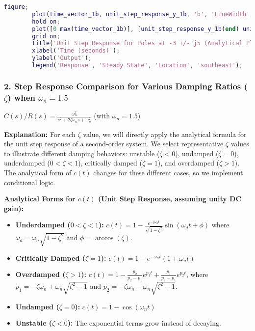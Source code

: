 \documentclass{article}
\begin{document}
\begin{lstlisting}[language=Matlab, caption=MATLAB Code for Problem 1(b) (Using Formulas)]
		figure;
		plot(time_vector_1b, unit_step_response_y_1b, 'b', 'LineWidth', 1.5);
		hold on;
		plot([0 max(time_vector_1b)], [unit_step_response_y_1b(end) unit_step_response_y_1b(end)], 'r--', 'DisplayName', 'Steady State');
		grid on;
		title('Unit Step Response for Poles at -3 +/- j5 (Analytical Plot)');
		xlabel('Time (seconds)');
		ylabel('Output');
		legend('Response', 'Steady State', 'Location', 'southeast');
	\end{lstlisting}
	
	\subsubsection*{2. Step Response Comparison for Various Damping Ratios ($\zeta$) when $\omega_n = 1.5$}
	$C(s)/R(s) = \frac{\omega_n^2}{s^2 + 2\zeta\omega_n s + \omega_n^2}$ (with $\omega_n = 1.5$)
	
	\textbf{Explanation:}
	For each $\zeta$ value, we will directly apply the analytical formula for the unit step response of a second-order system.
	We select representative $\zeta$ values to illustrate different damping behaviors: unstable ($\zeta < 0$), undamped ($\zeta = 0$), underdamped ($0 < \zeta < 1$), critically damped ($\zeta = 1$), and overdamped ($\zeta > 1$). The analytical form of $c(t)$ changes for these different cases, so we implement conditional logic.
	
	\textbf{Analytical Forms for $c(t)$ (Unit Step Response, assuming unity DC gain):}
	\begin{itemize}
		\item \textbf{Underdamped ($0 < \zeta < 1$):}
		$c(t) = 1 - \frac{e^{-\zeta\omega_n t}}{\sqrt{1-\zeta^2}} \sin(\omega_d t + \phi)$ where $\omega_d = \omega_n \sqrt{1-\zeta^2}$ and $\phi = \arccos(\zeta)$.
		
		\item \textbf{Critically Damped ($\zeta = 1$):}
		$c(t) = 1 - e^{-\omega_n t} (1 + \omega_n t)$
		
		\item \textbf{Overdamped ($\zeta > 1$):}
		$c(t) = 1 - \frac{p_2}{p_2-p_1} e^{p_1 t} + \frac{p_1}{p_2-p_1} e^{p_2 t}$, where $p_1 = -\zeta\omega_n + \omega_n\sqrt{\zeta^2-1}$ and $p_2 = -\zeta\omega_n - \omega_n\sqrt{\zeta^2-1}$.
		
		\item \textbf{Undamped ($\zeta = 0$):}
		$c(t) = 1 - \cos(\omega_n t)$
		
		\item \textbf{Unstable ($\zeta < 0$):} The exponential terms grow instead of decaying.
	\end{itemize}
	
\end{document}
